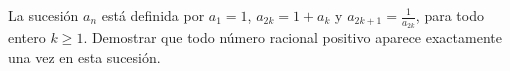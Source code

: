 La sucesión $a_n$ está definida por $a_1 = 1$, $a_{2k} = 1 + a_k$ y $a_{2k+1} = \frac{1}{a_{2k}}$, para todo entero $k \geq 1$. \newline 
Demostrar que todo número racional positivo aparece exactamente una vez en esta sucesión.
